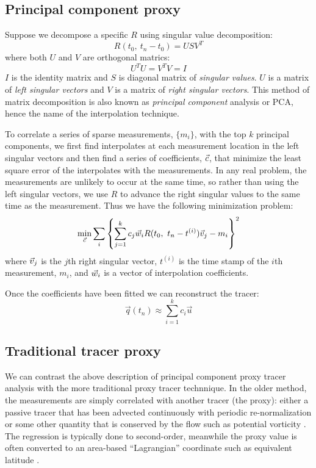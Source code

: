 \documentclass{article}
\begin{document}
\subsection{Principal component proxy}

Suppose we decompose a specific $R$ using singular value decomposition:
\begin{equation}
	R(t_0, ~ t_n - t_0) = U S V^T
\end{equation}
where both $U$ and $V$ are orthogonal matrics:
\begin{equation}
	U^T U = V^T V = I
\end{equation}
$I$ is the identity matrix and $S$ is diagonal matrix of {\it singular values}.
$U$ is a matrix of {\it left singular vectors} and 
$V$ is a matrix of {\it right singular vectors}.
This method of matrix decomposition is also known as {\it principal component}
analysis or PCA, hence the name of the interpolation technique.

To correlate a series of sparse measurements, $\lbrace m_i \rbrace$,
with the top $k$ principal components, we first find interpolates at each
measurement location in the left singular vectors and then find a series
of coefficients, $\vec c$, that minimize the least square error of the
interpolates with the measurements.
In any real problem, the measurements are unlikely to occur at the same time,
so rather than using the left singular vectors, we use $R$ to advance the
right singular values to the same time as the measurement. 
Thus we have the following minimization problem:
\begin{equation}
	\min_{\vec c} \sum_i \left \lbrace \sum_{j=1}^k c_j \vec w_i R(t_0, ~ t_n-t^{(i)}) \vec v_j - m_i \right \rbrace^2
\end{equation}
where $\vec v_j$ is the $j$th right singular vector, $t^{(i)}$ is the time
stamp of the $i$th measurement, $m_i$, and $\vec w_i$ is a vector of 
interpolation coefficients.

Once the coefficients have been fitted we can reconstruct the tracer:
\begin{equation}
	\vec q(t_n) \approx \sum_{i=1}^k c_i \vec u
\end{equation}

\subsection{Traditional tracer proxy}

We can contrast the above description of principal component proxy tracer
analysis with the more traditional proxy tracer technnique.
In the older method, the measurements are simply correlated with another
tracer (the proxy): either a passive tracer that has been advected
continuously with periodic re-normalization \citep{Allen_Nakamura2003} 
or some other quantity that is conserved by the flow 
such as potential vorticity \citep{Randall_etal2002,Hoskins_etal1985}.
The regression is typically done to second-order, meanwhile the proxy value
is often converted to an area-based ``Lagrangian'' coordinate such as
equivalent latitude \citep{Butchart_Remsberg1986}.
\end{document}
